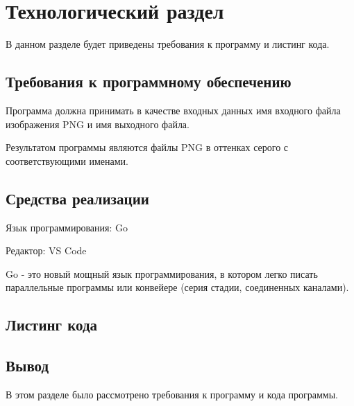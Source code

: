 \chapter{Технологический раздел}
\label{cha:impl}

В данном разделе будет приведены требования к программу и листинг кода.

\section{Требования к программному обеспечению}

Программа должна принимать в качестве входных данных имя входного файла изображения PNG и имя выходного файла.

Результатом программы являются файлы PNG в оттенках серого с соответствующими именами.


\section{Средства реализации}

Язык программирования: Go

Редактор: VS Code

Go - это новый мощный язык программирования,
в котором легко писать параллельные программы или конвейере
(серия стадии, соединенных каналами).



\section{Листинг кода}




\section{Вывод}

В этом разделе было рассмотрено требования к программу и кода программы.